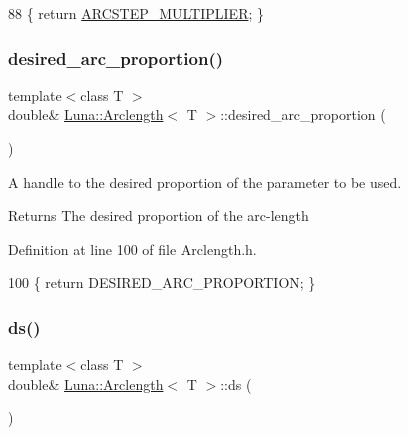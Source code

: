 \begin{DoxyCode}
88 \{ \textcolor{keywordflow}{return} \hyperlink{classLuna_1_1Arclength_ae1ff8d41d3e81d9ce335d19de4a269cc}{ARCSTEP\_MULTIPLIER}; \}
\end{DoxyCode}
\mbox{\label{classLuna_1_1Arclength_a4a14037ceffcca21d1417c22894470fb}} 
\subsubsection{\texorpdfstring{desired\+\_\+arc\+\_\+proportion()}{desired\_arc\_proportion()}}
{\footnotesize\ttfamily template$<$class T $>$ \\
double\& \hyperlink{classLuna_1_1Arclength}{Luna\+::\+Arclength}$<$ T $>$\+::desired\+\_\+arc\+\_\+proportion (\begin{DoxyParamCaption}{ }\end{DoxyParamCaption})\hspace{0.3cm}{\ttfamily [inline]}}



A handle to the desired proportion of the parameter to be used. 

\begin{DoxyReturn}{Returns}
The desired proportion of the arc-\/length 
\end{DoxyReturn}


Definition at line 100 of file Arclength.\+h.


\begin{DoxyCode}
100 \{ \textcolor{keywordflow}{return} DESIRED\_ARC\_PROPORTION; \}
\end{DoxyCode}
\mbox{\label{classLuna_1_1Arclength_af92962a44295884704ebc6196ffbd6f6}} 
\subsubsection{\texorpdfstring{ds()}{ds()}}
{\footnotesize\ttfamily template$<$class T $>$ \\
double\& \hyperlink{classLuna_1_1Arclength}{Luna\+::\+Arclength}$<$ T $>$\+::ds (\begin{DoxyParamCaption}{ }\end{DoxyParamCaption})\hspace{0.3cm}{\ttfamily [inline]}}



